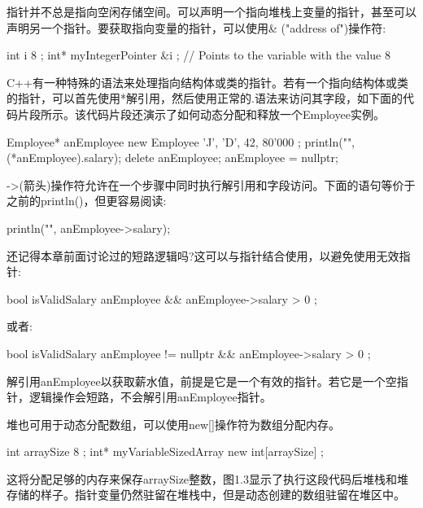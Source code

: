 指针并不总是指向空闲存储空间。可以声明一个指向堆栈上变量的指针，甚至可以声明另一个指针。要获取指向变量的指针，可以使用\& ("address of")操作符:

\begin{cpp}
int i { 8 };
int* myIntegerPointer { &i }; // Points to the variable with the value 8
\end{cpp}

C++有一种特殊的语法来处理指向结构体或类的指针。若有一个指向结构体或类的指针，可以首先使用*解引用，然后使用正常的.语法来访问其字段，如下面的代码片段所示。该代码片段还演示了如何动态分配和释放一个Employee实例。

\begin{cpp}
Employee* anEmployee { new Employee { 'J', 'D', 42, 80'000 } };
println("{}", (*anEmployee).salary);
delete anEmployee; anEmployee = nullptr;
\end{cpp}

->(箭头)操作符允许在一个步骤中同时执行解引用和字段访问。下面的语句等价于之前的println()，但更容易阅读:

\begin{cpp}
println("{}", anEmployee->salary);
\end{cpp}

还记得本章前面讨论过的短路逻辑吗?这可以与指针结合使用，以避免使用无效指针:

\begin{cpp}
bool isValidSalary { anEmployee && anEmployee->salary > 0 };
\end{cpp}

或者:

\begin{cpp}
bool isValidSalary { anEmployee != nullptr && anEmployee->salary > 0 };
\end{cpp}

解引用anEmployee以获取薪水值，前提是它是一个有效的指针。若它是一个空指针，逻辑操作会短路，不会解引用anEmployee指针。


堆也可用于动态分配数组，可以使用new[]操作符为数组分配内存。

\begin{cpp}
int arraySize { 8 };
int* myVariableSizedArray { new int[arraySize] };
\end{cpp}

这将分配足够的内存来保存arraySize整数，图1.3显示了执行这段代码后堆栈和堆存储的样子。指针变量仍然驻留在堆栈中，但是动态创建的数组驻留在堆区中。


